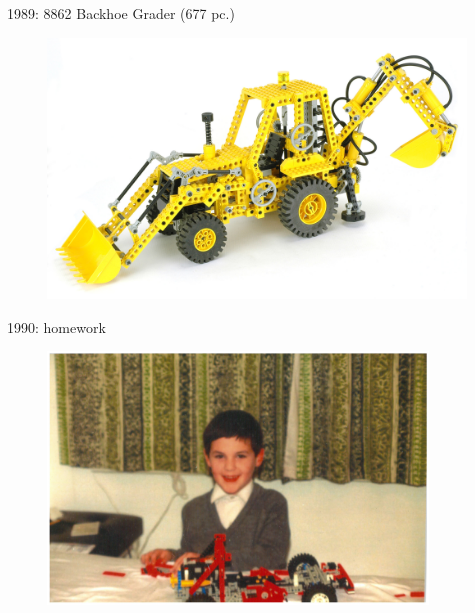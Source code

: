 \documentclass[xcolor=dvipsnames]{beamer}
\begin{document}
\begin{frame}[fragile]{1989: 8862 Backhoe Grader (677 pc.)}
\begin{figure}[H]
 \centering
 \includegraphics[width=0.99\textwidth]{1989_8862_digger.jpg}
\end{figure}
\end{frame}

\begin{frame}[fragile]{1990: homework}
\begin{figure}[H]
 \centering
 \includegraphics[width=0.9\textwidth]{1990_me.jpg}
\end{figure}
\end{frame}
\end{document}
